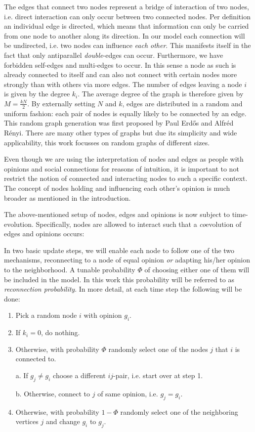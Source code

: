 \documentclass[11pt]{article}
\begin{document}
The edges that connect two nodes represent a bridge of interaction of two nodes, i.e. direct interaction can only occur between two connected nodes. Per definition an individual edge is directed, which means that information can only be carried from one node to another along its direction. In our model each connection will be undirected, i.e. two nodes can influence \textit{each other}. This manifests itself in the fact that only antiparallel \textit{double}-edges can occur. Furthermore, we have forbidden self-edges and multi-edges to occur. In this sense a node as such is already connected to itself and can also not connect with certain nodes more strongly than with others via more edges. The number of edges leaving a node $i$ is given by the degree $k_i$. The average degree of the graph is therefore given by $M=\frac{kN}{2}$. By externally setting $N$ and $k$, edges are distributed in a random and uniform fashion: each pair of nodes is equally likely to be connected by an edge. This random graph generation was first proposed by Paul Erdős and Alfréd Rényi.\cite{Erdos} There are many other types of graphs but due its simplicity and wide applicability, this work focusses on random graphs of different sizes. 

Even though we are using the interpretation of nodes and edges as people with opinions and social connections for reasons of intuition, it is important to not restrict the notion of connected and interacting nodes to such a specific context. The concept of nodes holding and influencing each other's opinion is much broader as mentioned in the introduction.

The above-mentioned setup of nodes, edges and opinions is now subject to time-evolution. Specifically, nodes are allowed to interact such that a \textit{co}evolution of edges and opinions occurs: 

In two basic update steps, we will enable each node to follow one of the two mechanisms, reconnecting to a node of equal opinion \textit{or} adapting his/her opinion to the neighborhood. A tunable probability $\Phi$ of choosing either one of them will be included in the model. In this work this probability will be referred to as \textit{reconnection probability}. In more detail, at each time step the following will be done:

\begin{enumerate}
\item Pick a random node $i$ with opinion $g_i$. 
\item If $k_i=0$, do nothing. 
\item Otherwise, with probability $\Phi$ randomly select one of the nodes $j$ that $i$ is connected to.

a. If $g_j \neq g_i$ choose a different $ij$-pair, i.e. start over at step 1.

b. Otherwise, connect to $j$ of same opinion, i.e. $g_j = g_i$.

\item Otherwise, with probability $1-\Phi$ randomly select one of the neighboring vertices $j$ and change $g_i$ to $g_j$.
\end{enumerate}
\end{document}
